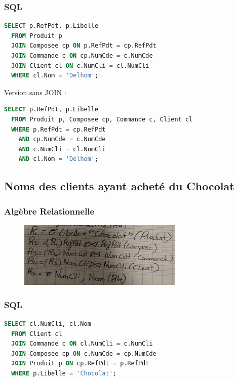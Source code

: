 \documentclass{article}
\begin{document}
\subsubsection{SQL}

\begin{lstlisting}[language=SQL]
  SELECT p.RefPdt, p.Libelle 
  FROM Produit p
  JOIN Composee cp ON p.RefPdt = cp.RefPdt
  JOIN Commande c ON cp.NumCde = c.NumCde
  JOIN Client cl ON c.NumCli = cl.NumCli
  WHERE cl.Nom = 'Delhom';
\end{lstlisting}

Version sans JOIN :

\begin{lstlisting}[language=SQL]
  SELECT p.RefPdt, p.Libelle 
  FROM Produit p, Composee cp, Commande c, Client cl
  WHERE p.RefPdt = cp.RefPdt 
    AND cp.NumCde = c.NumCde 
    AND c.NumCli = cl.NumCli 
    AND cl.Nom = 'Delhom';
\end{lstlisting}

\subsection{Noms des clients ayant acheté du Chocolat}

\subsubsection{Algèbre Relationnelle}

\begin{figure}[H]
  \centering
  \includegraphics[width=0.7\textwidth]{alg/7.png}
  \label{fig:alg-rel}
\end{figure}

\subsubsection{SQL}

\begin{lstlisting}[language=SQL]
  SELECT cl.NumCli, cl.Nom 
  FROM Client cl
  JOIN Commande c ON cl.NumCli = c.NumCli
  JOIN Composee cp ON c.NumCde = cp.NumCde
  JOIN Produit p ON cp.RefPdt = p.RefPdt
  WHERE p.Libelle = 'Chocolat';
\end{lstlisting}
\end{document}
